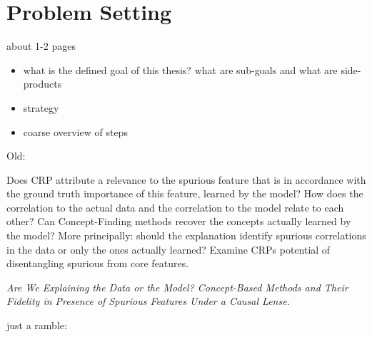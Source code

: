 \chapter{Problem Setting}\label{chapter:problem_setting}
{ \color{red}

    about 1-2 pages

    \begin{itemize}
        \item what is the defined goal of this thesis? what are sub-goals and what are side-products
        \item strategy
        \item coarse overview of steps
    \end{itemize}
}
Old:

Does CRP attribute a relevance to the spurious feature that is in accordance with the ground truth importance of this feature, learned by the model?
How does the correlation to the actual data and the correlation to the model relate to each other?
Can Concept-Finding methods recover the concepts actually learned by the model?
More principally: should the explanation identify spurious correlations in the data or only the ones actually learned?
Examine CRPs potential of disentangling spurious from core features.


\textit{Are We Explaining the Data or the Model?
    Concept-Based Methods and Their Fidelity in Presence of Spurious Features Under a Causal Lense.}

just a ramble:

